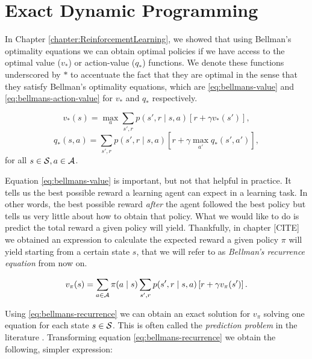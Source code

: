 \section{Exact Dynamic Programming}
In Chapter \ref{chapter:ReinforcementLearning}, we showed that using Bellman's
optimality equations we can obtain optimal policies if we have access to the
optimal value ($v_*$) or action-value ($q_{*}$) functions. We denote these
functions underscored by $*$ to accentuate the fact that they are optimal in the
sense that they satisfy Bellman's optimality equations, which are
\eqref{eq:bellmans-value} and \eqref{eq:bellmans-action-value} for $v_*$ and
$q_*$ respectively. 


\begin{equation}
\label{eq:bellmans-value}
v_{*}(s) = \max_{a} \sum_{s', r} p(s', r \mid s, a) \left[ r + \gamma v_{*} (s')
\right],
\end{equation}
\begin{equation}
\label{eq:bellmans-action-value}
q_{*}(s, a) = \sum_{s', r} p(s', r \mid s, a) \left[ r + \gamma \max_{a'} q_{*}
(s', a') \right],
\end{equation}
for all $s \in \mathcal{S}, a \in \mathcal{A}$.

Equation \eqref{eq:bellmans-value} is important, but not that helpful in
practice. It tells us the best possible reward a learning agent can expect in a
learning task. In other words, the best possible reward \textit{after} the agent
followed the best policy but tells us very little about how to obtain that
policy. What we would like to do is predict the total reward a given policy will
yield. Thankfully, in chapter [CITE] we obtained an expression to calculate the
expected reward a given policy $\pi$ will yield starting from a certain state
$s$, that we will refer to as \textit{Bellman's recurrence equation} from now
on. 

\begin{equation}
\label{eq:bellmans-recurrence}
v_\pi (s) = \sum_{a \in \mathcal{A}} \pi(a \mid s) \sum_{s', r} p(s', r \mid s, a) \left[ r + \gamma v_{\pi}(s') \right].
\end{equation}

Using \eqref{eq:bellmans-recurrence} we can obtain an exact solution for $v_\pi$
solving one equation for each state $s \in \mathcal{S}$. This is often called the
\textit{prediction problem} in the literature \cite[Chapter~4.1]{SuttonBarto}. Transforming
equation \eqref{eq:bellmans-recurrence} we obtain the following, simpler
expression:

